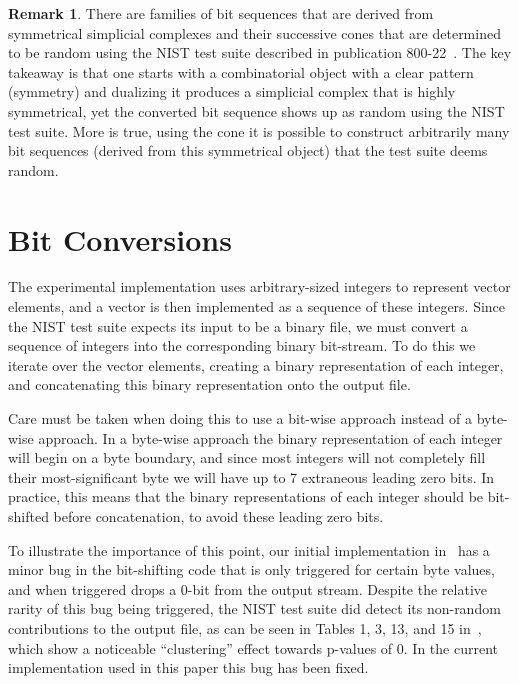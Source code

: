 \documentclass[oneside,12pt]{amsart}
\theoremstyle{definition}
\newtheorem{Remark}[Theorem]{Remark}
\numberwithin{equation}{section}
\begin{document}
\begin{Remark}
There are families of bit sequences that are derived from symmetrical simplicial complexes and their successive cones that are determined to be random using the NIST test suite described in publication 800-22~\cite{NIST}.
The key takeaway is that one starts with a combinatorial object with a clear pattern (symmetry) and dualizing it produces a simplicial complex that is highly symmetrical, yet the converted bit sequence shows up as random using the NIST test suite.
More is true, using the cone it is possible to construct arbitrarily many bit sequences (derived from this symmetrical object) that the test suite deems random.
\end{Remark}

\section{Bit Conversions} \label{bitconversions}

The experimental implementation uses arbitrary-sized integers to represent vector elements, and a vector is then implemented as a sequence of these integers.
Since the NIST test suite \cite{NIST} expects its input to be a binary file, we must convert a sequence of integers into the corresponding binary bit-stream. 
To do this we iterate over the vector elements, creating a binary representation of each integer, and concatenating this binary representation onto the output file. 

Care must be taken when doing this to use a bit-wise approach instead of a byte-wise approach. 
In a byte-wise approach the binary representation of each integer will begin on a byte boundary, and since most integers will not completely fill their most-significant byte we will have up to 7 extraneous leading zero bits.
In practice, this means that the binary representations of each integer should be bit-shifted before concatenation, to avoid these leading zero bits.

To illustrate the importance of this point, our initial implementation in~\cite{ALDH} has a minor bug in the bit-shifting code that is only triggered for certain byte values, and when triggered drops a 0-bit from the output stream. 
Despite the relative rarity of this bug being triggered, the NIST test suite did detect its non-random contributions to the output file, as can be seen in Tables 1, 3, 13, and 15 in~\cite{ALDH}, which show a noticeable ``clustering'' effect towards p-values of 0.
In the current implementation used in this paper this bug has been fixed.
\end{document}
